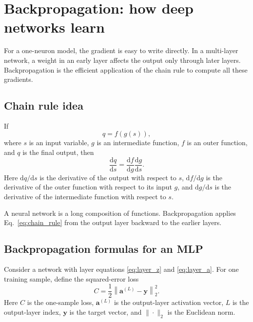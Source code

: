 \documentclass[11pt]{article}
\newcommand{\dd}{\mathrm{d}}
\newcommand{\by}{\bm{y}}
\begin{document}
\section{Backpropagation: how deep networks learn}

For a one-neuron model, the gradient is easy to write directly.  In a multi-layer network, a weight in an early layer affects the output only through later layers.  Backpropagation is the efficient application of the chain rule to compute all these gradients.

\subsection{Chain rule idea}

If
\begin{equation}
    q = f(g(s)),
    \label{eq:chain_q}
\end{equation}
where $s$ is an input variable, $g$ is an intermediate function, $f$ is an outer function, and $q$ is the final output, then
\begin{equation}
    \frac{\dd q}{\dd s}=\frac{\dd f}{\dd g}\frac{\dd g}{\dd s}.
    \label{eq:chain_rule}
\end{equation}
Here $\dd q/\dd s$ is the derivative of the output with respect to $s$, $\dd f/\dd g$ is the derivative of the outer function with respect to its input $g$, and $\dd g/\dd s$ is the derivative of the intermediate function with respect to $s$.

A neural network is a long composition of functions.  Backpropagation applies Eq.~\eqref{eq:chain_rule} from the output layer backward to the earlier layers.

\subsection{Backpropagation formulas for an MLP}

Consider a network with layer equations \eqref{eq:layer_z} and \eqref{eq:layer_a}.  For one training sample, define the squared-error loss
\begin{equation}
    C = \frac{1}{2}\left\|\bm{a}^{(L)}-\by\right\|_2^2.
    \label{eq:bp_loss}
\end{equation}
Here $C$ is the one-sample loss, $\bm{a}^{(L)}$ is the output-layer activation vector, $L$ is the output-layer index, $\by$ is the target vector, and $\|\cdot\|_2$ is the Euclidean norm.
\end{document}
